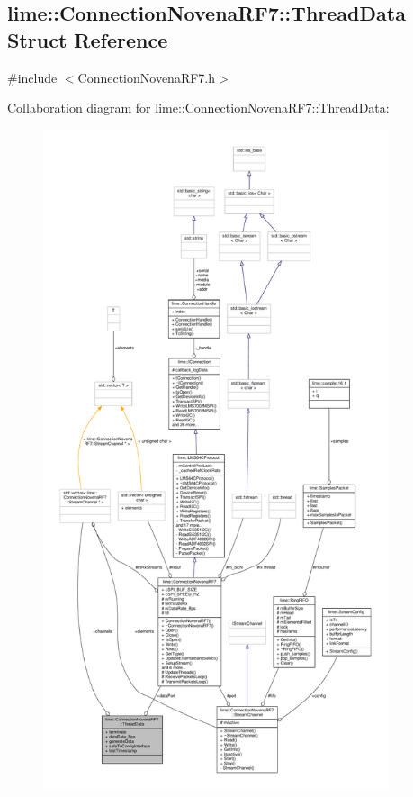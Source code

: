 \subsection{lime\+:\+:Connection\+Novena\+R\+F7\+:\+:Thread\+Data Struct Reference}
\label{structlime_1_1ConnectionNovenaRF7_1_1ThreadData}


{\ttfamily \#include $<$Connection\+Novena\+R\+F7.\+h$>$}



Collaboration diagram for lime\+:\+:Connection\+Novena\+R\+F7\+:\+:Thread\+Data\+:
\nopagebreak
\begin{figure}[H]
\begin{center}
\leavevmode
\includegraphics[height=550pt]{d5/d07/structlime_1_1ConnectionNovenaRF7_1_1ThreadData__coll__graph}
\end{center}
\end{figure}

